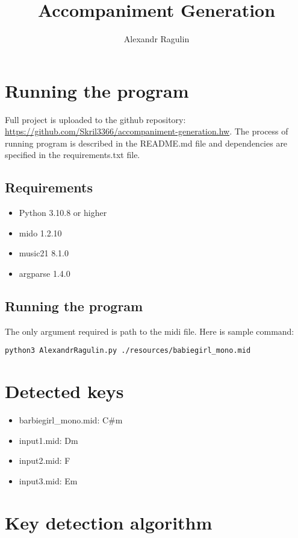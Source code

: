 \documentclass{article}
\title{Accompaniment Generation}
\author{Alexandr Ragulin}
\begin{document}
\maketitle

\section{Running the program}
Full project is uploaded to the github repository:
\href{https://github.com/Skril3366/accompaniment-generation.hw}{https://github.com/Skril3366/accompaniment-generation.hw}.
The process of running program is described in the README.md file and
dependencies are specified in the requirements.txt file.

\subsection{Requirements}

\begin{itemize}
  \item Python 3.10.8 or higher
  \item mido 1.2.10
  \item music21 8.1.0
  \item argparse 1.4.0
\end{itemize}

\subsection{Running the program}

The only argument required is path to the midi file. Here is sample command:
\begin{verbatim}
python3 AlexandrRagulin.py ./resources/babiegirl_mono.mid
\end{verbatim}

\section{Detected keys}

\begin{itemize}
  \item barbiegirl\_mono.mid: C\#m
  \item input1.mid: Dm
  \item input2.mid: F
  \item input3.mid: Em
\end{itemize}

\section{Key detection algorithm}
\end{document}
